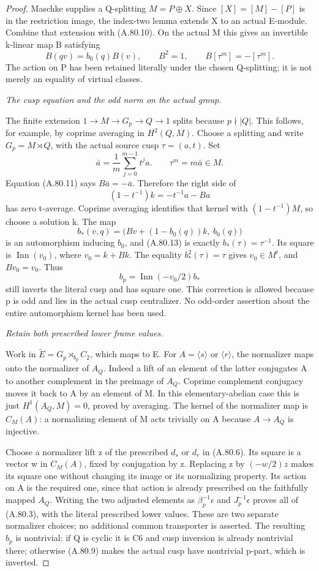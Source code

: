 \begin{proof}
Maschke supplies a Q-splitting \(M=P\oplus X\).
Since \([X]=[M]-[P]\) is in the restriction image, the
index-two lemma extends X to an actual E-module. Combine
that extension with (A.80.10). On the actual M this gives
an invertible k-linear map B satisfying
\[
 B(qv)=b_0(q)B(v),\qquad B^2=1,
 \qquad B[\tau^m]=-[\tau^m].
 \tag{A.80.11}
\]
The action on P has been retained literally under the chosen
Q-splitting; it is not merely an equality of virtual classes.

\emph{The cusp equation and the odd norm on the actual group.}\par
The finite extension \(1\to M\to G_p\to Q\to1\)
splits because \(p\nmid|Q|\). This follows, for example,
by coprime averaging in \(H^2(Q,M)\). Choose a splitting
and write \(G_p=M\rtimes Q\), with the actual source
cusp \(\tau=(a,t)\). Set
\[
        \bar a=\frac1m\sum_{j=0}^{m-1}t^j a.
        \qquad \tau^m=m\bar a\in M.
 \tag{A.80.12}
\]
Equation (A.80.11) says \(B\bar a=-\bar a\).
Therefore the right side of
\[
                   (1-t^{-1})k=-t^{-1}a-Ba
 \tag{A.80.13}
\]
has zero t-average. Coprime averaging identifies that kernel
with \((1-t^{-1})M\), so choose a solution k. The map
\[
 b_*(v,q)=\bigl(Bv+(1-b_0(q))k,\ b_0(q)\bigr)
 \tag{A.80.14}
\]
is an automorphism inducing \(b_0\), and (A.80.13) is
exactly \(b_*(\tau)=\tau^{-1}\). Its square is
\(\operatorname{Inn}(v_0)\), where \(v_0=k+Bk\).
The equality \(b_*^2(\tau)=\tau\) gives
\(v_0\in M^t\), and \(Bv_0=v_0\). Thus
\[
                        b_p=\operatorname{Inn}(-v_0/2)b_*
 \tag{A.80.15}
\]
still inverts the literal cusp and has square one. This
correction is allowed because p is odd and lies in the actual
cusp centralizer. No odd-order assertion about the entire
automorphism kernel has been used.

\emph{Retain both prescribed lower frame values.}\par
Work in \(\widetilde E=G_p\rtimes_{b_p}C_2\), which
maps to E. For \(A=\langle s\rangle\) or
\(\langle r\rangle\), the normalizer maps onto the
normalizer of \(A_Q\). Indeed a lift of an element of
the latter conjugates A to another complement in the
preimage of \(A_Q\). Coprime complement conjugacy moves
it back to A by an element of M. In this elementary-abelian
case this is just \(H^1(A_Q,M)=0\), proved by averaging.
The kernel of the normalizer map is \(C_M(A)\): a
normalizing element of M acts trivially on A because
\(A\to A_Q\) is injective.

Choose a normalizer lift z of the prescribed \(d_s\) or
\(d_r\) in (A.80.6). Its square is a vector w in
\(C_M(A)\), fixed by conjugation by z. Replacing z by
\((-w/2)z\) makes its square one without changing its
image or its normalizing property. Its action on A is the
required one, since that action is already prescribed on
the faithfully mapped \(A_Q\). Writing the two adjusted
elements as \(\beta_p^{-1}\epsilon\) and
\(J_p^{-1}\epsilon\) proves all of (A.80.3), with
the literal prescribed lower values. These are two separate
normalizer choices; no additional common transporter is
asserted. The resulting \(b_p\) is nontrivial: if Q is
cyclic it is C6 and cusp inversion is already nontrivial
there; otherwise (A.80.9) makes the actual cusp have
nontrivial p-part, which is inverted.


\end{proof}

